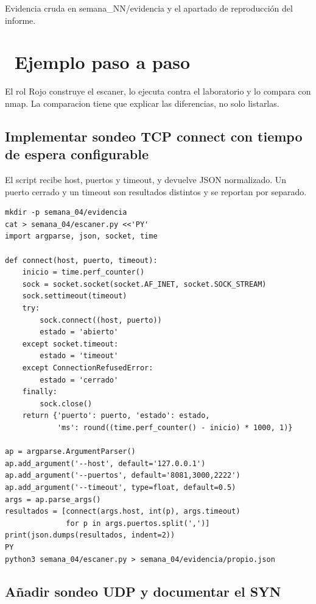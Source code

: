 \documentclass[11pt,a4paper]{article}
\newcommand{\iconotexto}[2]{\textcolor{cyanNeon}{\faIcon{#1}}~#2}
\begin{document}
Evidencia cruda en semana\_NN/evidencia y el apartado de reproducción del informe.

\section{\iconotexto{list-ol}{Ejemplo paso a paso}}

El rol Rojo construye el escaner, lo ejecuta contra el laboratorio y lo compara con nmap. La comparacion tiene que explicar las diferencias, no solo listarlas.

\subsection{Implementar sondeo TCP connect con tiempo de espera configurable}

El script recibe host, puertos y timeout, y devuelve JSON normalizado. Un puerto cerrado y un timeout son resultados distintos y se reportan por separado.

\begin{lstlisting}[style=estiloCodigo]
mkdir -p semana_04/evidencia
cat > semana_04/escaner.py <<'PY'
import argparse, json, socket, time

def connect(host, puerto, timeout):
    inicio = time.perf_counter()
    sock = socket.socket(socket.AF_INET, socket.SOCK_STREAM)
    sock.settimeout(timeout)
    try:
        sock.connect((host, puerto))
        estado = 'abierto'
    except socket.timeout:
        estado = 'timeout'
    except ConnectionRefusedError:
        estado = 'cerrado'
    finally:
        sock.close()
    return {'puerto': puerto, 'estado': estado,
            'ms': round((time.perf_counter() - inicio) * 1000, 1)}

ap = argparse.ArgumentParser()
ap.add_argument('--host', default='127.0.0.1')
ap.add_argument('--puertos', default='8081,3000,2222')
ap.add_argument('--timeout', type=float, default=0.5)
args = ap.parse_args()
resultados = [connect(args.host, int(p), args.timeout)
              for p in args.puertos.split(',')]
print(json.dumps(resultados, indent=2))
PY
python3 semana_04/escaner.py > semana_04/evidencia/propio.json
\end{lstlisting}

\subsection{Añadir sondeo UDP y documentar el SYN}
\end{document}
